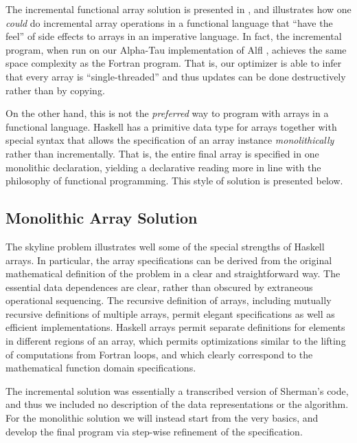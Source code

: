 The incremental functional array solution is presented in
\cite{huda88f}, and illustrates how one {\em could} do incremental
array operations in a functional language that ``have the feel'' of
side effects to arrays in an imperative language.  In fact, the
incremental program, when run on our Alpha-Tau implementation of Alfl
\cite{huda84b}, achieves the same space complexity as the Fortran
program.  That is, our optimizer is able to infer that every array is
``single-threaded'' and thus updates can be done destructively rather
than by copying.

On the other hand, this is not the {\em preferred} way to program with
arrays in a functional language.  Haskell has a primitive data type
for arrays together with special syntax that allows the specification
of an array instance {\em monolithically} rather than incrementally.
That is, the entire final array is specified in one monolithic
declaration, yielding a declarative reading more in line with the
philosophy of functional programming.  This style of solution is
presented below.

\newcommand {\bmba}[1]  { \[ \begin{array}{#1} }
\newcommand {\eaem}     { \end{array} \] }
\newcommand {\belongs}  { \epsilon }

\subsection{Monolithic Array Solution}

The skyline problem illustrates well some of the special strengths of
Haskell arrays.  In particular, the array specifications can be
derived from the original mathematical definition of the problem in a
clear and straightforward way.  The essential data dependences are
clear, rather than obscured by extraneous operational sequencing.  The
recursive definition of arrays, including mutually recursive
definitions of multiple arrays, permit elegant specifications as well
as efficient implementations.  Haskell arrays permit separate
definitions for elements in different regions of an array, which
permits optimizations similar to the lifting of computations from
Fortran loops, and which clearly correspond to the mathematical
function domain specifications.

The incremental solution was essentially a transcribed version of
Sherman's code, and thus we included no description of the data
representations or the algorithm.  For the monolithic solution we will
instead start from the very basics, and develop the final program via
step-wise refinement of the specification.

